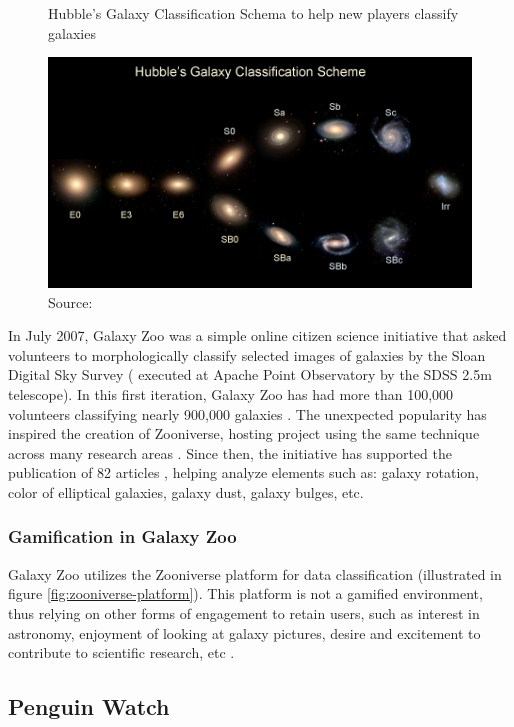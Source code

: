 \begin{figure}[ht]
    \centering
    \caption{Hubble's Galaxy Classification Schema to help new players classify galaxies}
    \includegraphics[width=0.8\linewidth]{images/background/galaxyzoo-training.jpg}
    \caption*{Source: \cite{galaxyzoo2010hubble}}
    \label{fig:galaxyzoo-hubble}
\end{figure}

In July 2007, Galaxy Zoo was a simple online citizen science initiative that asked volunteers to morphologically classify selected images of galaxies by the Sloan Digital Sky Survey (\cite{york2000sloan} executed at Apache Point Observatory by the SDSS 2.5m telescope). In this first iteration, Galaxy Zoo has had more than 100,000 volunteers classifying nearly 900,000 galaxies \cite{lintott2011galaxy}. The unexpected popularity has inspired the creation of Zooniverse, hosting project using the same technique across many research areas \cite{zooniverse2021galaxy}. Since then, the initiative has supported the publication of 82 articles \cite{galaxyzoo2021publications}, helping analyze elements such as: galaxy rotation, color of elliptical galaxies, galaxy dust, galaxy bulges, etc.

\subsubsection{Gamification in Galaxy Zoo}

Galaxy Zoo utilizes the Zooniverse platform for data classification (illustrated in figure \ref{fig:zooniverse-platform}). This platform is not a gamified environment, thus relying on other forms of engagement to retain users, such as interest in astronomy, enjoyment of looking at galaxy pictures, desire and excitement to contribute to scientific research, etc \cite{raddick2009galaxy}.

\subsection{Penguin Watch}

